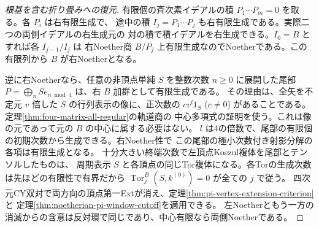 \begin{proof}[根基を含む折り畳みへの復元]
有限個の斉次素イデアルの積 $P_1\cdots P_m=0$ を取る。各 $P_i$ は右有限生成で、
途中の積 $I_j=P_1\cdots P_j$ も右有限生成である。実際二つの両側イデアルの右生成元の
対の積で積イデアルを右生成できる。$I_0=B$ とすれば各 $I_{j-1}/I_j$ は
右Noether商 $B/P_j$ 上有限生成なのでNoetherである。この有限列から $B$ が右Noetherとなる。

逆に右Noetherなら、任意の非頂点単純 $S$ を整数次数 $n\ge0$ に展開した尾部
$P=\bigoplus_n S e_{n\bmod4}$ は、右 $B$ 加群として有限生成である。
その理由は、全矢を不定元 $v$ 倍した $S$ の行列表示の像に、正次数の
$c v^l 1_S$ ($c\ne0$) があることである。定理\ref{thm:four-matrix-all-regular}の軌道商の
中心多項式の証明を使う。これは像の元であって元の $B$ の中心に属する必要はない。
$l$ は4の倍数で、尾部の有限個の初期次数から生成できる。右Noether性で
この尾部の極小次数付き射影分解の各項は有限生成となる。
十分大きい終端次数で左頂点Koszul複体を尾部とテンソルしたものは、
周期表示 $S$ と各頂点の同じTor複体になる。各Torの生成次数は先ほどの有限性で有界だから
$\operatorname{Tor}_j^B(S,k^{(0)})=0$ が全ての $j$ で従う。
四次元CY双対で両方向の頂点第一Extが消え、定理\ref{thm:pi-vertex-extension-criterion}と
定理\ref{thm:noetherian-pi-window-cutoff}を適用できる。
左Noetherともう一方の消滅からの含意は反対環で同じであり、中心有限なら両側Noetherである。
\end{proof}
